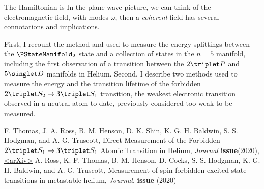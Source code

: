 
	The Hamiltonian is
	In the plane wave picture, we can think of the electromagnetic field, with modes $\omega$, then a \emph{coherent} field has several connotations and implications.
	 



	First, I recount the method and used to measure the energy splittings between the $\PStateManifold_2$ state and a collection of states in the $n=5$ manifold, including the first observation of a transition between the $2\triplet P$ and $5\singlet D$ manifolds in Helium.
	Second, I describe two methods used to measure the energy and the transition lifetime of the forbidden $2\triplet S_2\rightarrow 3\triplet S_1$ transition, the weakest electronic transition observed in a neutral atom to date, previously considered too weak to be measured\cite{Lach01}.
	


	F.
	Thomas, J.
	A.
	Ross, B.
	M.
	Henson, D.
	K.
	Shin, K.
	G.
	H.
	Baldwin, S.
	S.
	Hodgman, and A.
	G.
	Truscott, Direct Measurement of the Forbidden $2\triplet S_1\rightarrow 3\triplet S_1$ Atomic Transition in Helium, \emph{Journal} \textbf{issue}(2020), \href{<https://arxiv.org/abs/2002.04811>}{<arXiv>}
	 A.
	 Ross,  K.
	 F.
	 Thomas,  B.
	 M.
	 Henson,  D.
	 Cocks, S.
	 S.
	 Hodgman,  K.
	 G.
	 H.
	 Baldwin,  and  A.
	 G.
	 Truscott, Measurement of spin-forbidden excited-state transitions in metastable helium, \emph{Journal}, \textbf{issue} (2020) 

